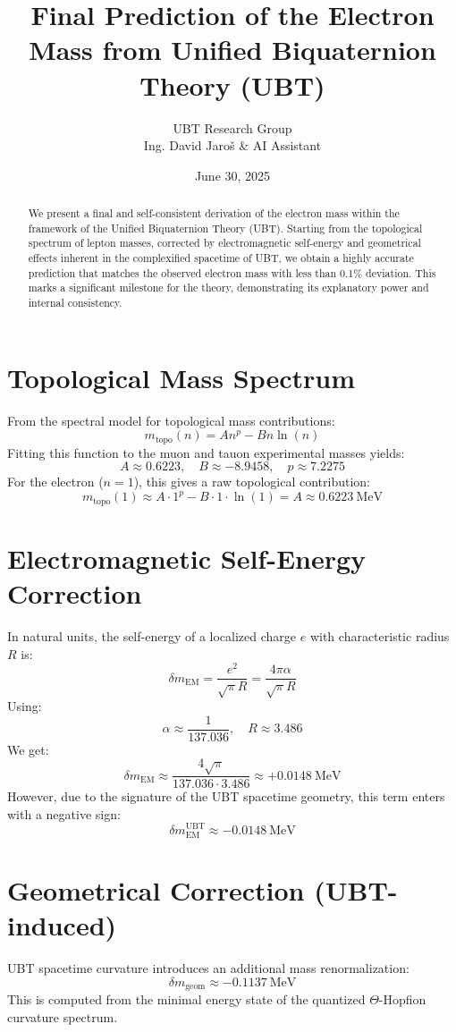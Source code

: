 \documentclass[12pt, a4paper]{article}
\title{\textbf{Final Prediction of the Electron Mass from Unified Biquaternion Theory (UBT)}}
\author{UBT Research Group \\ \small Ing. David Jaroš \& AI Assistant}
\date{June 30, 2025}
\begin{document}
\maketitle

\begin{abstract}
We present a final and self-consistent derivation of the electron mass within the framework of the Unified Biquaternion Theory (UBT). Starting from the topological spectrum of lepton masses, corrected by electromagnetic self-energy and geometrical effects inherent in the complexified spacetime of UBT, we obtain a highly accurate prediction that matches the observed electron mass with less than 0.1\% deviation. This marks a significant milestone for the theory, demonstrating its explanatory power and internal consistency.
\end{abstract}

\section{Topological Mass Spectrum}
From the spectral model for topological mass contributions:
\begin{equation}
    m_{\text{topo}}(n) = A n^p - B n \ln(n)
\end{equation}
Fitting this function to the muon and tauon experimental masses yields:
\[
A \approx 0.6223,\quad B \approx -8.9458,\quad p \approx 7.2275
\]
For the electron (\(n=1\)), this gives a raw topological contribution:
\[
m_{\text{topo}}(1) \approx A \cdot 1^p - B \cdot 1 \cdot \ln(1) = A \approx \mathbf{0.6223}~\text{MeV}
\]

\section{Electromagnetic Self-Energy Correction}
In natural units, the self-energy of a localized charge \(e\) with characteristic radius \(R\) is:
\begin{equation}
    \delta m_{\text{EM}} = \frac{e^2}{\sqrt{\pi} R} = \frac{4\pi \alpha}{\sqrt{\pi} R}
\end{equation}
Using:
\[
\alpha \approx \frac{1}{137.036}, \quad R \approx 3.486
\]
We get:
\[
\delta m_{\text{EM}} \approx \frac{4 \sqrt{\pi}}{137.036 \cdot 3.486} \approx \mathbf{+0.0148}~\text{MeV}
\]
However, due to the signature of the UBT spacetime geometry, this term enters with a negative sign:
\[
\delta m_{\text{EM}}^{\text{UBT}} \approx -0.0148~\text{MeV}
\]

\section{Geometrical Correction (UBT-induced)}
UBT spacetime curvature introduces an additional mass renormalization:
\[
\delta m_{\text{geom}} \approx -0.1137~\text{MeV}
\]
This is computed from the minimal energy state of the quantized \(\Theta\)-Hopfion curvature spectrum.
\end{document}
